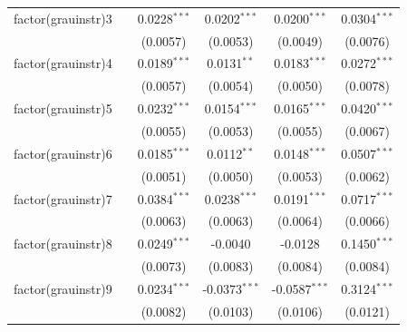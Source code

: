\begin{tabular}{lccccc}
   factor(grauinstr)3       &                       & 0.0228$^{***}$         & 0.0202$^{***}$          & 0.0200$^{***}$          & 0.0304$^{***}$\\   
                            &                       & (0.0057)               & (0.0053)                & (0.0049)                & (0.0076)\\   
   factor(grauinstr)4       &                       & 0.0189$^{***}$         & 0.0131$^{**}$           & 0.0183$^{***}$          & 0.0272$^{***}$\\   
                            &                       & (0.0057)               & (0.0054)                & (0.0050)                & (0.0078)\\   
   factor(grauinstr)5       &                       & 0.0232$^{***}$         & 0.0154$^{***}$          & 0.0165$^{***}$          & 0.0420$^{***}$\\   
                            &                       & (0.0055)               & (0.0053)                & (0.0055)                & (0.0067)\\   
   factor(grauinstr)6       &                       & 0.0185$^{***}$         & 0.0112$^{**}$           & 0.0148$^{***}$          & 0.0507$^{***}$\\   
                            &                       & (0.0051)               & (0.0050)                & (0.0053)                & (0.0062)\\   
   factor(grauinstr)7       &                       & 0.0384$^{***}$         & 0.0238$^{***}$          & 0.0191$^{***}$          & 0.0717$^{***}$\\   
                            &                       & (0.0063)               & (0.0063)                & (0.0064)                & (0.0066)\\   
   factor(grauinstr)8       &                       & 0.0249$^{***}$         & -0.0040                 & -0.0128                 & 0.1450$^{***}$\\   
                            &                       & (0.0073)               & (0.0083)                & (0.0084)                & (0.0084)\\   
   factor(grauinstr)9       &                       & 0.0234$^{***}$         & -0.0373$^{***}$         & -0.0587$^{***}$         & 0.3124$^{***}$\\   
                            &                       & (0.0082)               & (0.0103)                & (0.0106)                & (0.0121)\\   

\end{tabular}

